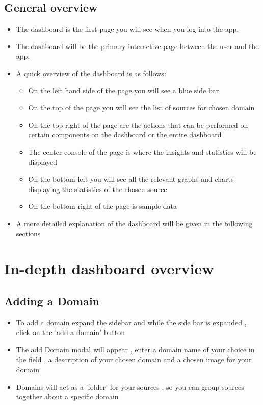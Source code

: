 \documentclass[12pt]{article}
\begin{document}
\subsection{General overview}
\begin{itemize}
    \item The dashboard is the first page you will see when you log into the app.
    \item The dashboard will be the primary interactive page between the user and the app.
    \item A quick overview of the dashboard is as follows:
    \begin{itemize}
        \item On the left hand side of the page you will see a blue side bar 
        \item On the top of the page you will see the list of sources for chosen domain
        \item On the top right of the page are the actions that can be performed on certain components on the dashboard or the entire dashboard
        \item The center console of the page is where the insights and statistics will be displayed 
        \item On the bottom left you will see all the relevant graphs and charts displaying the statistics of the chosen source 
        \item On the bottom right of the page is sample data
    \end{itemize}
    \item A more detailed explanation of the dashboard will be given in the following sections
\end{itemize}

\section{In-depth dashboard overview}
\subsection{Adding a Domain}
\begin{itemize}
    \item To add a domain expand the sidebar and while the side bar is expanded , click on the 'add a domain' button
    \item The add Domain modal will appear , enter a domain name of your choice in the field , a description of your chosen domain and a chosen image for your domain 
    \item Domains will act as a 'folder' for your sources , so you can group sources together about a specific domain
\end{itemize}
\end{document}
